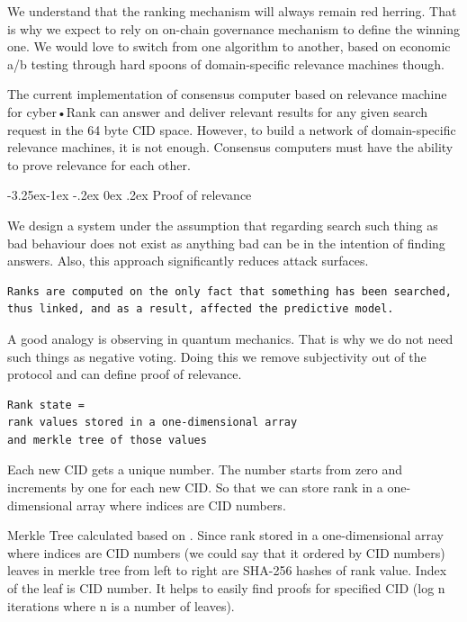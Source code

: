 \documentclass[8pt,oneside]{amsart}
\makeatletter
\newcommand{\linkgreen}[2]{\href{#1}{\color{green}{#2}}}
\renewcommand\subsection{\@startsection{subsection}{2}{\z@}%
                                     {-3.25ex\@plus -1ex \@minus -.2ex}%
                                     {0ex \@plus .2ex}%
                                     {\play\Large}}%
\newcommand{\titleSection}[1]{\subsection{#1}}
\newcommand{\code}[1]{{\PlayBold #1}}
\makeatother
\begin{document}
We understand that the ranking mechanism will always remain red herring. That is why we expect to rely on on-chain governance mechanism to define the winning one. We would love to switch from one algorithm to another, based on economic a/b testing through hard spoons of domain-specific relevance machines though.  

The current implementation of consensus computer based on relevance machine for cyber•Rank can answer and deliver relevant results for any given search request in the 64 byte CID space. However, to build a network of domain-specific relevance machines, it is not enough. Consensus computers must have the ability to prove relevance for each other.

\titleSection{Proof of relevance}\label{Proof of relevance}

We design a system under the assumption that regarding search such thing as bad behaviour does not exist as anything bad can be in the intention of finding answers. Also, this approach significantly reduces attack surfaces.

\begin{lstlisting}
Ranks are computed on the only fact that something has been searched,
thus linked, and as a result, affected the predictive model.
\end{lstlisting}

A good analogy is observing in quantum mechanics. That is why we do not need such things as negative voting. Doing this we remove subjectivity out of the protocol and can define proof of relevance.

\begin{lstlisting}
Rank state =
rank values stored in a one-dimensional array
and merkle tree of those values
\end{lstlisting}

Each new CID gets a unique number. The number starts from zero and increments by one for each new CID. So that we can store rank in a one-dimensional array where indices are CID numbers.

Merkle Tree calculated based on \linkgreen{https://tools.ietf.org/html/rfc6962#section-2.1}{RFC-6962 standard}. Since rank stored in a one-dimensional array where indices are CID numbers (we could say that it ordered by CID numbers) leaves in merkle tree from left to right are \code{SHA-256} hashes of rank value. Index of the leaf is CID number. It helps to easily find proofs for specified CID (\code{log n} iterations where \code{n} is a number of leaves).
\end{document}
